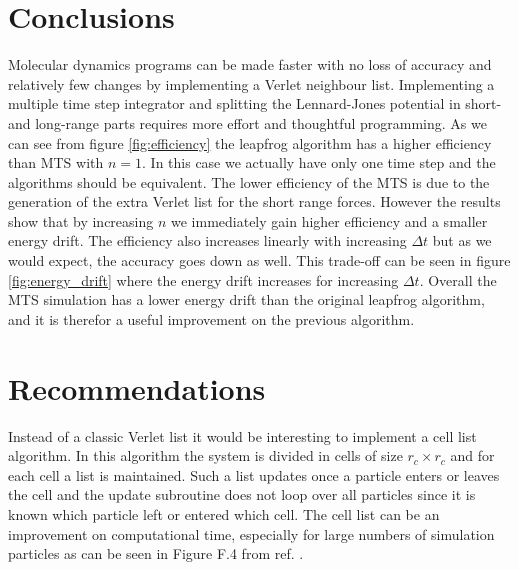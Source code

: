 \documentclass[a4paper]{article}
\begin{document}
\section{Conclusions}
Molecular dynamics programs can be made faster with no loss of accuracy and relatively few changes
by implementing a Verlet neighbour list. Implementing a multiple time step integrator and splitting
the Lennard-Jones potential in short- and long-range parts requires more effort and thoughtful
programming. As we can see from figure \ref{fig:efficiency} the leapfrog algorithm has a higher
efficiency than MTS with $n=1$. In this case we actually have only one time step and the algorithms
should be equivalent. The lower efficiency of the MTS is due to the generation of the extra Verlet
list for the short range forces. However the results show that by increasing $n$ we immediately gain
higher efficiency and a smaller energy drift. The efficiency also increases linearly with increasing
$\Delta t$ but as we would expect, the accuracy goes down as well. This trade-off can be seen in
figure \ref{fig:energy_drift} where the energy drift increases for increasing $\Delta t$. Overall
the MTS simulation has a lower energy drift than the original leapfrog algorithm, and it is therefor
a useful improvement on the previous algorithm.

\section{Recommendations}
Instead of a classic Verlet list it would be interesting to implement a cell list algorithm. In this
algorithm the system is divided in cells of size $r_c \times r_c$ and for each cell a list is
maintained. Such a list updates once a particle enters or leaves the cell and the update subroutine
does not loop over all particles since it is known which particle left or entered which cell. The
cell list can be an improvement on computational time, especially for large numbers of simulation
particles as can be seen in Figure F.4 from ref. \cite{molsim}.




\end{document}
